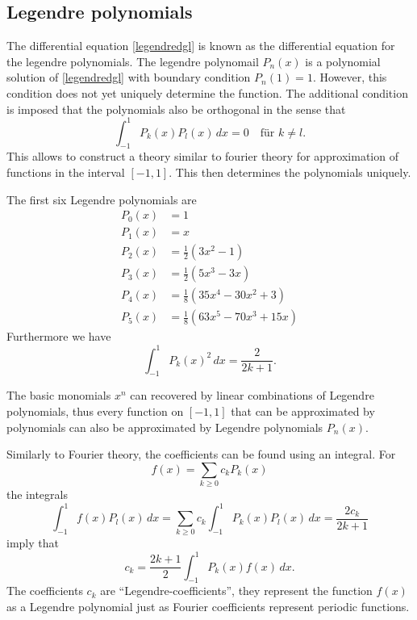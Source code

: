 \subsection{Legendre polynomials}
The differential equation \eqref{legendredgl} is known as the differential
equation for the legendre polynomials.
The legendre polynomail $P_n(x)$ is a polynomial solution of
\eqref{legendredgl} with boundary condition $P_n(1)=1$.
However, this condition does not yet uniquely determine the function.
The additional condition is imposed that the polynomials also be
orthogonal in the sense that
\[
\int_{-1}^1 P_k(x)P_l(x)\,dx=0\quad\text{für $k\ne l$}.
\]
This allows to construct a theory similar to fourier theory for
approximation of functions in the interval $[-1,1]$.
This then determines the polynomials uniquely.

The first six Legendre polynomials are
\begin{align*}
P_0(x)&=1\\
P_1(x)&=x\\
P_2(x)&=\frac12(3x^2-1)\\
P_3(x)&=\frac12(5x^3-3x)\\
P_4(x)&=\frac18(35x^4-30x^2+3)\\
P_5(x)&=\frac18(63x^5-70x^3+15x)
\end{align*}
Furthermore we have
\[
\int_{-1}^1 P_k(x)^2\,dx = \frac{2}{2k+1}.
\]

The basic monomials $x^n$ can recovered by linear combinations of Legendre
polynomials, thus every function on $[-1,1]$ that can be approximated by
polynomials can also be approximated by Legendre polynomials $P_n(x)$.

Similarly to Fourier theory, the coefficients can be found using an
integral.
For
\[
f(x)=\sum_{k\ge 0} c_k P_k(x)
\]
the integrals
\[
\int_{-1}^1 f(x)P_l(x)\,dx
=
\sum_{k\ge 0} c_k \int_{-1}^1 P_k(x)P_l(x)\,dx
=
\frac{2c_k}{2k+1}
\]
imply that
\[
c_k=\frac{2k+1}{2}\int_{-1}^1P_k(x)f(x)\,dx.
\]
The coefficients $c_k$ are ``Legendre-coefficients'', they represent
the function $f(x)$ as a Legendre polynomial just as Fourier coefficients
represent periodic functions.

